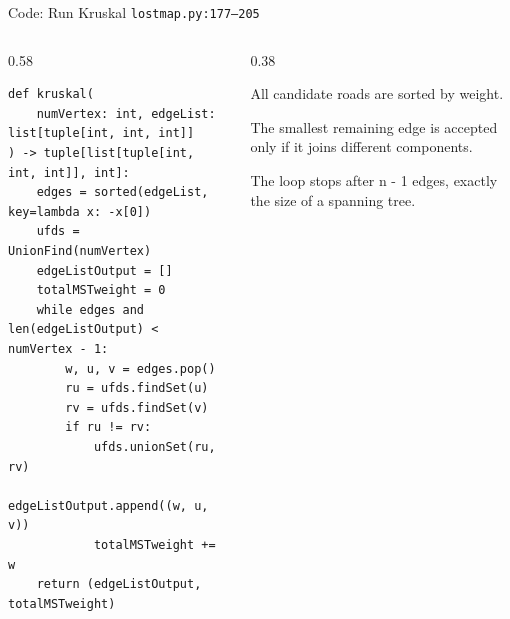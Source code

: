\documentclass[aspectratio=169,11pt]{beamer}
\begin{document}
\begin{frame}[fragile]{Code: Run Kruskal}
\scriptsize
{} \texttt{lostmap.py:177--205}

\vspace{0.08cm}
\begin{columns}[T,totalwidth=\textwidth]
\begin{column}{0.58\textwidth}
\begin{lstlisting}[style=cpcode]
def kruskal(
    numVertex: int, edgeList: list[tuple[int, int, int]]
) -> tuple[list[tuple[int, int, int]], int]:
    edges = sorted(edgeList, key=lambda x: -x[0])
    ufds = UnionFind(numVertex)
    edgeListOutput = []
    totalMSTweight = 0
    while edges and len(edgeListOutput) < numVertex - 1:
        w, u, v = edges.pop()
        ru = ufds.findSet(u)
        rv = ufds.findSet(v)
        if ru != rv:
            ufds.unionSet(ru, rv)
            edgeListOutput.append((w, u, v))
            totalMSTweight += w
    return (edgeListOutput, totalMSTweight)
\end{lstlisting}
\end{column}
\begin{column}{0.38\textwidth}
\begin{tightitemize}
  \item All candidate roads are sorted by weight.
  \item The smallest remaining edge is accepted only if it joins different components.
  \item The loop stops after n - 1 edges, exactly the size of a spanning tree.
\end{tightitemize}
\end{column}
\end{columns}
\end{frame}
\end{document}
